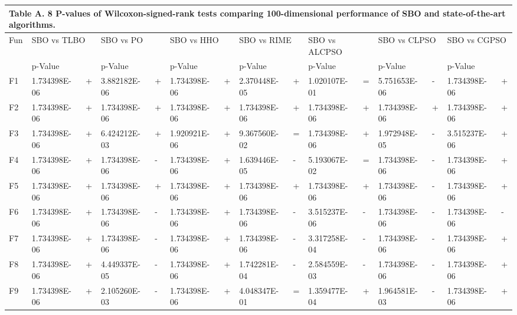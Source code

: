 \documentclass{article} %
\begin{document}
\begin{tabular}{|p{0.3in}|p{0.5in}|p{0.2in}|p{0.5in}|p{0.2in}|p{0.5in}|p{0.2in}|p{0.5in}|p{0.2in}|p{0.5in}|p{0.1in}|p{0.5in}|p{0.1in}|p{0.5in}|p{0.1in}|} \hline 
\multicolumn{15}{|p{1in}|}{\textbf{Table A. }8\textbf{ }P-values of Wilcoxon-signed-rank tests comparing 100-dimensional performance of SBO and state-of-the-art algorithms.\textbf{}} \\ \hline 
Fun & \multicolumn{2}{|p{0.7in}|}{SBO vs TLBO} & \multicolumn{2}{|p{0.7in}|}{SBO vs PO} & \multicolumn{2}{|p{0.7in}|}{SBO vs HHO} & \multicolumn{2}{|p{0.7in}|}{SBO vs RIME} & \multicolumn{2}{|p{0.7in}|}{SBO vs ALCPSO} & \multicolumn{2}{|p{0.7in}|}{SBO vs CLPSO} & \multicolumn{2}{|p{0.7in}|}{SBO vs CGPSO} \\ \hline 
 & p-Value &  & p-Value &  & p-Value &  & p-Value &  & p-Value &  & p-Value &  & p-Value &  \\ \hline 
F1 & 1.734398E-06 & + & 3.882182E-06 & + & 1.734398E-06 & + & 2.370448E-05 & + & 1.020107E-01 & = & 5.751653E-06 & - & 1.734398E-06 & + \\ \hline 
F2 & 1.734398E-06 & + & 1.734398E-06 & + & 1.734398E-06 & + & 1.734398E-06 & + & 1.734398E-06 & + & 1.734398E-06 & + & 1.734398E-06 & + \\ \hline 
F3 & 1.734398E-06 & + & 6.424212E-03 & + & 1.920921E-06 & + & 9.367560E-02 & = & 1.734398E-06 & + & 1.972948E-05 & - & 3.515237E-06 & + \\ \hline 
F4 & 1.734398E-06 & + & 1.734398E-06 & - & 1.734398E-06 & + & 1.639446E-05 & - & 5.193067E-02 & = & 1.734398E-06 & - & 1.734398E-06 & + \\ \hline 
F5 & 1.734398E-06 & + & 1.734398E-06 & + & 1.734398E-06 & + & 1.734398E-06 & + & 1.734398E-06 & + & 1.734398E-06 & - & 1.734398E-06 & + \\ \hline 
F6 & 1.734398E-06 & + & 1.734398E-06 & - & 1.734398E-06 & + & 1.734398E-06 & - & 3.515237E-06 & - & 1.734398E-06 & - & 1.734398E-06 & - \\ \hline 
F7 & 1.734398E-06 & + & 1.734398E-06 & - & 1.734398E-06 & + & 1.734398E-06 & - & 3.317258E-04 & - & 1.734398E-06 & - & 1.734398E-06 & + \\ \hline 
F8 & 1.734398E-06 & + & 4.449337E-05 & - & 1.734398E-06 & + & 1.742281E-04 & - & 2.584559E-03 & - & 1.734398E-06 & - & 1.734398E-06 & + \\ \hline 
F9 & 1.734398E-06 & + & 2.105260E-03 & - & 1.734398E-06 & + & 4.048347E-01 & = & 1.359477E-04 & + & 1.964581E-03 & - & 1.734398E-06 & + \\ \hline 

\end{tabular}
\end{document}
